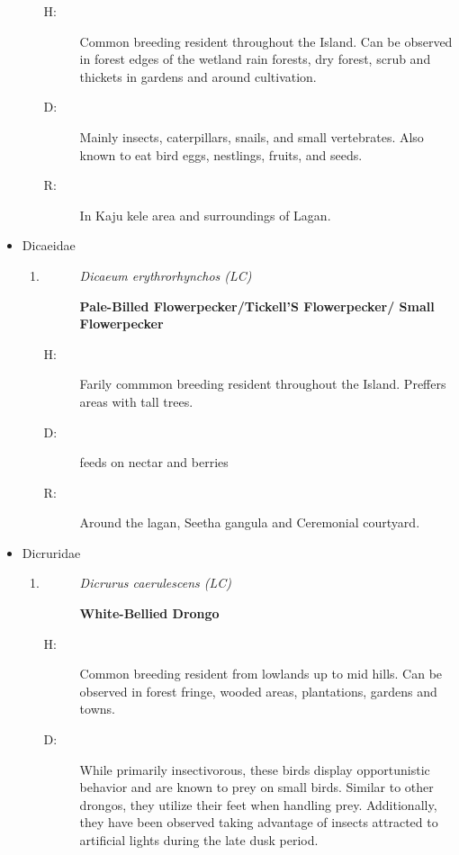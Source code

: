 \begin{itemize}
\begin{enumerate}
\begin{description}
\end{description}%
\begin{description}%
\item[H: ]%
Common breeding resident throughout the Island. Can be observed in forest edges of the wetland rain forests, dry forest, scrub and thickets in gardens and around cultivation.%
\item[D: ]%
Mainly  insects, caterpillars, snails, and small vertebrates. Also known to eat bird eggs, nestlings, fruits, and seeds.%
\item[R: ]%
In Kaju kele area and surroundings of Lagan.%
\end{description}%
\end{enumerate}%
\item%
Dicaeidae%
\begin{enumerate}%
\item%
\begin{description}%
\item[]%
\textit{Dicaeum erythrorhynchos (LC)}%
\item[]%
\textbf{Pale{-}Billed Flowerpecker/Tickell'S Flowerpecker/ Small Flowerpecker}%
\end{description}%
\begin{description}%
\item[H: ]%
Farily commmon breeding resident throughout the Island. Preffers areas with tall trees.%
\item[D: ]%
 feeds on nectar and berries%
\item[R: ]%
Around the lagan, Seetha gangula and Ceremonial courtyard.%
\end{description}%
\end{enumerate}%
\item%
Dicruridae%
\begin{enumerate}%
\item%
\begin{description}%
\item[]%
\textit{Dicrurus caerulescens (LC)}%
\item[]%
\textbf{White{-}Bellied Drongo}%
\end{description}%
\begin{description}%
\item[H: ]%
Common breeding resident from lowlands up to mid hills. Can be observed in forest fringe, wooded areas, plantations, gardens and towns.%
\item[D: ]%
While primarily insectivorous, these birds display opportunistic behavior and are known to prey on small birds. Similar to other drongos, they utilize their feet when handling prey. Additionally, they have been observed taking advantage of insects attracted to artificial lights during the late dusk period.%

\end{description}
\end{enumerate}
\end{itemize}
